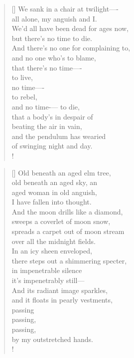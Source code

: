 \documentclass[]{article}
\begin{document}
\settowidth{\versewidth}{We sank in a chair at twilight--  } 
\begin{verse}[\versewidth]
We sank in a chair at twilight—- \\
all alone, my anguish and I.\\
We'd all have been dead for ages now,\\
but there's no time to die.\\
And there's no one for complaining to,\\
and no one who's to blame,\\
that there's no time—- \\
to live,\\
no time—- \\
to rebel,\\
and no time-— to die,\\
that a body's in despair of\\
beating the air in vain,\\
and the pendulum has wearied\\
of swinging night and day.\\!
\end{verse}
\newpage 

\settowidth{\versewidth}{and it floats in pearly vestments, }
\begin{verse}[\versewidth]
Old beneath an aged elm tree,\\
old beneath an aged sky, an\\
aged woman in old anguish,\\
I have fallen into thought.\\
And the moon drills like a diamond,\\
sweeps a coverlet of moon snow,\\
spreads a carpet out of moon stream\\
over all the midnight fields.\\
In an icy sheen enveloped,\\
there steps out a shimmering specter,\\
in impenetrable silence\\
it's impenetrably still—\\
And its radiant image sparkles,\\
and it floats in pearly vestments,\\
passing\\
\quad \quad passing,\\
\quad \quad \quad \quad passing,\\
by my outstretched hands.\\!
\end{verse}
\bigskip \bigskip
\end{document}
